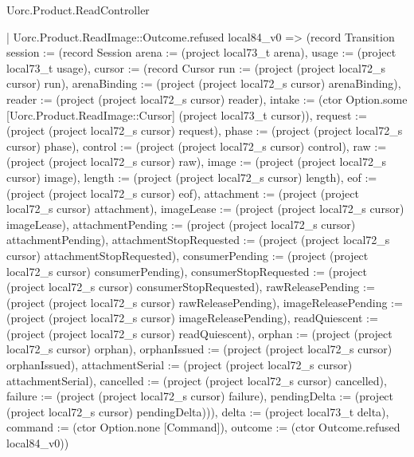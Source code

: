 \begin{lexlean}{Uorc.Product.ReadController}
\begin{semanticmodule}
{    | Uorc.Product.ReadImage::Outcome.refused local84_v0 => (record Transition {session := (record Session {arena := (project local73_t arena), usage := (project local73_t usage), cursor := (record Cursor {run := (project (project local72_s cursor) run), arenaBinding := (project (project local72_s cursor) arenaBinding), reader := (project (project local72_s cursor) reader), intake := (ctor Option.some [Uorc.Product.ReadImage::Cursor] (project local73_t cursor)), request := (project (project local72_s cursor) request), phase := (project (project local72_s cursor) phase), control := (project (project local72_s cursor) control), raw := (project (project local72_s cursor) raw), image := (project (project local72_s cursor) image), length := (project (project local72_s cursor) length), eof := (project (project local72_s cursor) eof), attachment := (project (project local72_s cursor) attachment), imageLease := (project (project local72_s cursor) imageLease), attachmentPending := (project (project local72_s cursor) attachmentPending), attachmentStopRequested := (project (project local72_s cursor) attachmentStopRequested), consumerPending := (project (project local72_s cursor) consumerPending), consumerStopRequested := (project (project local72_s cursor) consumerStopRequested), rawReleasePending := (project (project local72_s cursor) rawReleasePending), imageReleasePending := (project (project local72_s cursor) imageReleasePending), readQuiescent := (project (project local72_s cursor) readQuiescent), orphan := (project (project local72_s cursor) orphan), orphanIssued := (project (project local72_s cursor) orphanIssued), attachmentSerial := (project (project local72_s cursor) attachmentSerial), cancelled := (project (project local72_s cursor) cancelled), failure := (project (project local72_s cursor) failure), pendingDelta := (project (project local72_s cursor) pendingDelta)})}), delta := (project local73_t delta), command := (ctor Option.none [Command]), outcome := (ctor Outcome.refused local84_v0)})
}
\end{semanticmodule}
\end{lexlean}
